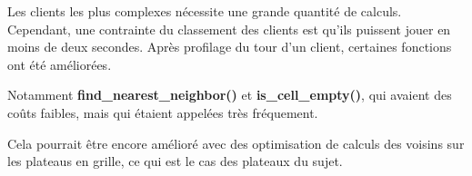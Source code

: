 Les clients les plus complexes nécessite une grande quantité de calculs.
Cependant, une contrainte du classement des clients est qu'ils puissent jouer en moins de deux secondes.
Après profilage du tour d'un client, certaines fonctions ont été améliorées.

Notamment \textbf{find\_nearest\_neighbor()} et \textbf{is\_cell\_empty()}, qui avaient des coûts faibles, 
mais qui étaient appelées très fréquement.

Cela pourrait être encore amélioré avec des 
optimisation de calculs des voisins sur les plateaus en grille, 
ce qui est le cas des plateaux du sujet.